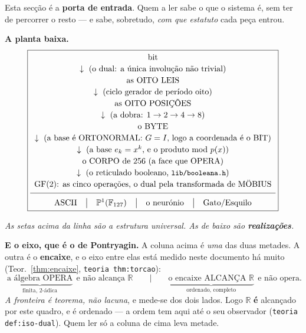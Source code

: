 \documentclass[11pt,a4paper]{article}
\newcommand{\code}[1]{\texttt{\small #1}}
\newcommand{\leitura}[1]{\code{#1}}
\begin{document}
Esta secção é a \textbf{porta de entrada}. Quem a ler sabe o que o
sistema é, sem ter de percorrer o resto --- e sabe, sobretudo,
\emph{com que estatuto} cada peça entrou.

\medskip
\noindent\textbf{A planta baixa.}
\[
\boxed{
\begin{array}{c}
\text{bit}\\[2pt]
\downarrow\ \text{(o dual: a única involução não trivial)}\\[2pt]
\text{as OITO LEIS}\\[2pt]
\downarrow\ \text{(ciclo gerador de período oito)}\\[2pt]
\text{as OITO POSIÇÕES}\\[2pt]
\downarrow\ \text{(a dobra: }1\to2\to4\to8)\\[2pt]
\text{o BYTE}\\[2pt]
\downarrow\ \text{(a base é ORTONORMAL: }G=I\text{, logo a coordenada é o BIT)}\\[2pt]
\downarrow\ \text{(a base }e_k=x^{k}\text{, e o produto mod }p(x))\\[2pt]
\text{o CORPO de }256\ \text{(a face que OPERA)}\\[2pt]
\downarrow\ \text{(o reticulado booleano, }\code{lib/booleana.h})\\[2pt]
\text{GF}(2)\text{: as cinco operações, o dual pela transformada de MÖBIUS}\\[4pt]
\hline\\[-6pt]
\text{ASCII}\quad\big|\quad\mathbb{P}^1(\mathbb{F}_{127})
\quad\big|\quad\text{o neurónio}\quad\big|\quad\text{Gato}/\text{Esquilo}
\end{array}}
\]
\begin{center}\small
\emph{As setas acima da linha são a estrutura universal.
As de baixo são \textbf{realizações}.}
\end{center}

\medskip
\noindent\textbf{E o eixo, que é o de Pontryagin.} A coluna acima é
\emph{uma} das duas metades. A outra é o \textbf{encaixe}, e o eixo entre
elas está medido neste documento há muito
(Teor.~\ref{thm:encaixe}, \leitura{teoria thm:torcao}):
\[
\boxed{\;
\underbrace{\text{a álgebra OPERA}}_{\text{finita, }2\text{-ádica}}
\ \ \text{e não alcança }\mathbb{R}
\qquad\Big|\qquad
\underbrace{\text{o encaixe ALCANÇA }\mathbb{R}}_{\text{ordenado, completo}}
\ \ \text{e não opera.}\;}
\]
\emph{A fronteira é teorema, não lacuna}, e mede-se dos dois lados. Logo
$\mathbb{R}$ \textbf{é} alcançado por este quadro, e é ordenado --- a
ordem tem aqui até o seu observador (\leitura{teoria def:iso-dual}). Quem ler
só a coluna de cima leva metade.
\end{document}
